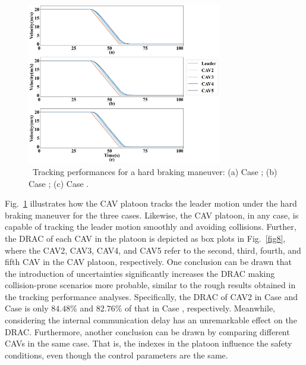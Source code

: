 \documentclass[journal]{IEEEtran}
\begin{document}
\begin{figure}
  \centering
  \includegraphics[width=8.5cm]{figs/fig7.png}
  \caption{~Tracking performances for a hard braking maneuver: (a) Case \uppercase\expandafter{}; (b) Case \uppercase\expandafter{}; (c) Case \uppercase\expandafter{}.}
  \label{fig7}
\end{figure}

Fig.~\ref{fig7} illustrates how the CAV platoon tracks the leader motion under the hard braking maneuver for the three cases. Likewise, the CAV platoon, in any case, is capable of tracking the leader motion smoothly and avoiding collisions. Further, the DRAC of each CAV in the platoon is depicted as box plots in Fig.~\ref{fig8}, where the CAV2, CAV3, CAV4, and CAV5 refer to the second, third, fourth, and fifth CAV in the CAV platoon, respectively. One conclusion can be drawn that the introduction of uncertainties significantly increases the DRAC making collision-prone scenarios more probable, similar to the rough results obtained in the tracking performance analyses. Specifically, the DRAC of CAV2 in Case \uppercase\expandafter{} and Case \uppercase\expandafter{} is only $84.48\%$ and $82.76\%$ of that in Case \uppercase\expandafter{}, respectively. Meanwhile, considering the internal communication delay has an unremarkable effect on the DRAC. Furthermore, another conclusion can be drawn by comparing different CAVs in the same case. That is, the indexes in the platoon influence the safety conditions, even though the control parameters are the same.
\end{document}

